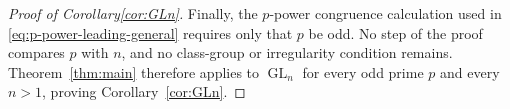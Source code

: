 \documentclass[11pt]{amsart}
\numberwithin{equation}{section}
\newcommand{\GL}{\operatorname{GL}}
\theoremstyle{definition}
\begin{document}
\begin{proof}[Proof of Corollary\ref{cor:GLn}]
Finally, the $p$-power congruence calculation used in
\eqref{eq:p-power-leading-general} requires only that $p$ be odd.  No
step of the proof compares $p$ with $n$, and no class-group or
irregularity condition remains.  Theorem~\ref{thm:main} therefore
applies to $\GL_n$ for every odd prime $p$ and every $n>1$, proving
Corollary~\ref{cor:GLn}.
\end{proof}




\end{document}
